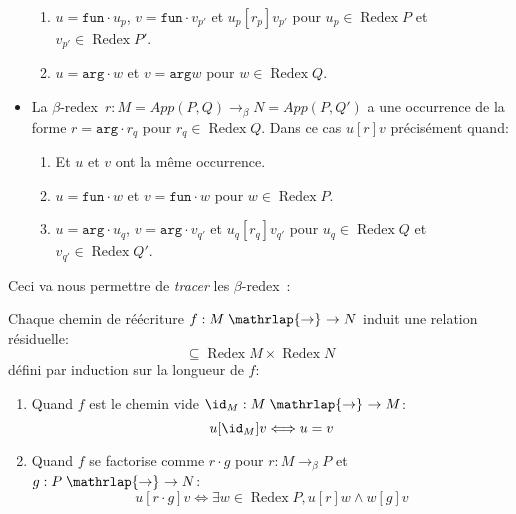 \documentclass[math, info]{cours}
\def\targ{\texttt{arg}}
\def\tfun{\texttt{fun}}
\def\betaredex{$\beta$-redex\ }
\newcommand{\rrightarrow}{\mathrel{\mathrlap{\rightarrow}\mkern1mu\rightarrow}}
\DeclareMathOperator{\Redex}{Redex}
\begin{document}
\begin{definition}
\begin{itemize}
\begin{enumerate}
			      \item $u = \tfun \cdot u_{p}$, $v = \tfun \cdot v_{p'}$ et $u_{p} [r_{p}] v_{p'}$ pour $u_{p} \in \Redex P$ et $v_{p'} \in \Redex P'$.
			      \item $u = \targ \cdot w$ et $v = \targ w$ pour $w\in \Redex Q$.
		      \end{enumerate}
		\item La \betaredex $r: M = App(P, Q) \to_{\beta} N = App(P, Q')$ a une occurrence de la forme $r = \targ \cdot r_{q}$ pour $r_{q} \in \Redex Q$.
		      Dans ce cas $u [r] v$ précisément quand:
		      \begin{enumerate}
			      \item Et $u$ et $v$ ont la même occurrence.
			      \item $u = \tfun \cdot w$ et $v = \tfun \cdot w$ pour $w \in \Redex P$.
			      \item $u = \targ \cdot u_{q}$, $v = \targ \cdot v_{q'}$ et $u_{q} [r_{q}] v_{q'}$ pour $u_{q} \in \Redex Q$ et $v_{q'} \in \Redex Q'$.
		      \end{enumerate}
	\end{itemize}
	\label{def:relationresiduelle}
\end{definition}

Ceci va nous permettre de \emph{tracer} les \betaredex:
\begin{proposition}
	Chaque chemin de réécriture $f: M\rrightarrow N$ induit une relation résiduelle:
	\begin{equation*}
		[f] \subseteq \Redex M \times \Redex N
	\end{equation*}
	défini par induction sur la longueur de $f$:
	\begin{enumerate}
		\item Quand $f$ est le chemin vide $\id_{M}: M \rrightarrow M$:
		      \begin{equation*}
			      u[\id_{M}] v \Longleftrightarrow u = v
		      \end{equation*}
		\item Quand $f$ se factorise comme $r \cdot g$ pour $r: M \to_{\beta} P$ et $g: P \rrightarrow N$:
		      \begin{equation*}
			      u [r\cdot g] v \Longleftrightarrow \exists w \in \Redex P, u [r] w \land w [g] v
		      \end{equation*}
	\end{enumerate}
	\label{prop:residuschemins}
\end{proposition}
\end{document}
